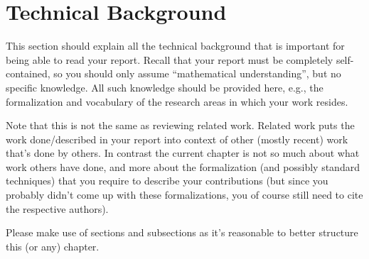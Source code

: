 \chapter{Technical Background}\label{chap:background}

This section should explain all the technical background that is important for being able to read your report. Recall that your report must be completely self-contained, so you should only assume ``mathematical understanding'', but no specific knowledge. All such knowledge should be provided here, e.g., the formalization and vocabulary of the research areas in which your work resides.

Note that this is not the same as reviewing related work. Related work puts the work done/described in your report into context of other (mostly recent) work that's done by others. In contrast the current chapter is not so much about what work others have done, and more about the formalization (and possibly standard techniques) that you require to describe your contributions (but since you probably didn't come up with these formalizations, you of course still need to cite the respective authors).

Please make use of sections and subsections as it's reasonable to better structure this (or any) chapter.

